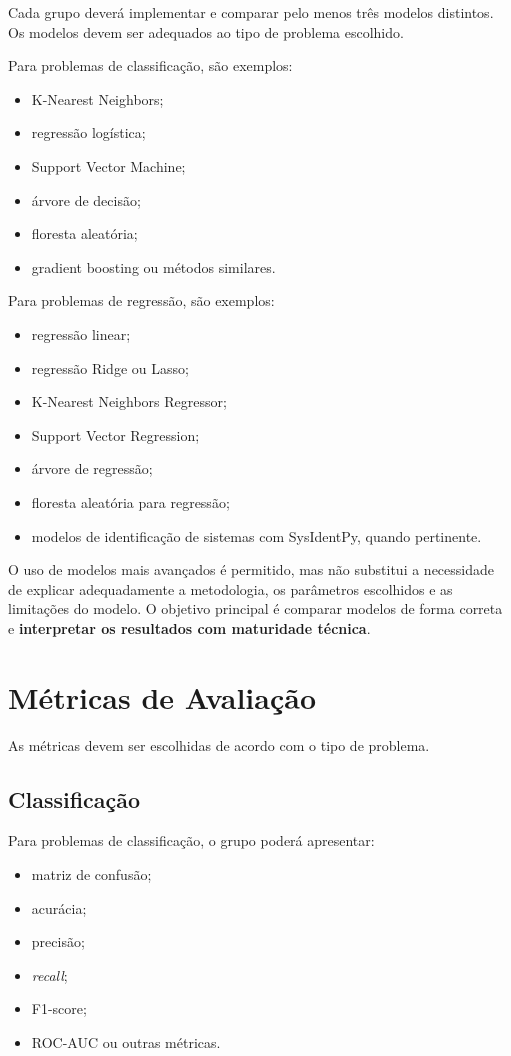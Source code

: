 \documentclass[a4paper]{ifacconf}
\begin{document}
Cada grupo deverá implementar e comparar pelo menos três modelos distintos. Os modelos devem ser adequados ao tipo de problema escolhido.

Para problemas de classificação, são exemplos:
\begin{itemize}
    \item K-Nearest Neighbors;
    \item regressão logística;
    \item Support Vector Machine;
    \item árvore de decisão;
    \item floresta aleatória;
    \item gradient boosting ou métodos similares.
\end{itemize}

Para problemas de regressão, são exemplos:
\begin{itemize}
    \item regressão linear;
    \item regressão Ridge ou Lasso;
    \item K-Nearest Neighbors Regressor;
    \item Support Vector Regression;
    \item árvore de regressão;
    \item floresta aleatória para regressão;
    \item modelos de identificação de sistemas com SysIdentPy, quando pertinente.
\end{itemize}

O uso de modelos mais avançados é permitido, mas não substitui a necessidade de explicar adequadamente a metodologia, os parâmetros escolhidos e as limitações do modelo. O objetivo principal é comparar modelos de forma correta e \textbf{interpretar os resultados com maturidade técnica}.

\section{Métricas de Avaliação}

As métricas devem ser escolhidas de acordo com o tipo de problema.

\subsection{Classificação}

Para problemas de classificação, o grupo poderá apresentar:
\begin{itemize}
    \item matriz de confusão;
    \item acurácia;
    \item precisão;
    \item \textit{recall};
    \item F1-score;
    \item ROC-AUC ou outras métricas.
\end{itemize}
\end{document}
